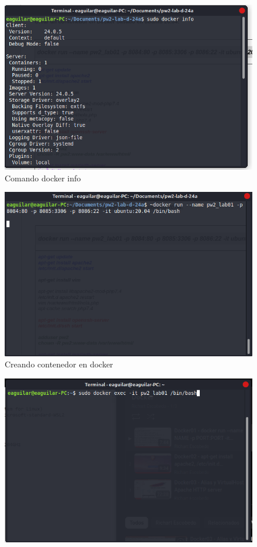 \documentclass{article}
\begin{document}
\begin{itemize}
  \begin{figure}[H]
  \centering
  \includegraphics[width=1\textwidth]{img/Pictures/dockerInfo.png}
  \caption{Comando docker info}
  \label{fig:imagen1}
\end{figure}
        \begin{figure}[H]
  \centering
  \includegraphics[width=1\textwidth]{img/Pictures/creandoContenedor.png}
  \caption{Creando contenedor en docker}
  \label{fig:imagen2}
\end{figure}
        \begin{figure}[H]
  \centering
  \includegraphics[width=1\textwidth]{img/Pictures/iniciar.png}

\end{figure}
\end{itemize}
\end{document}
